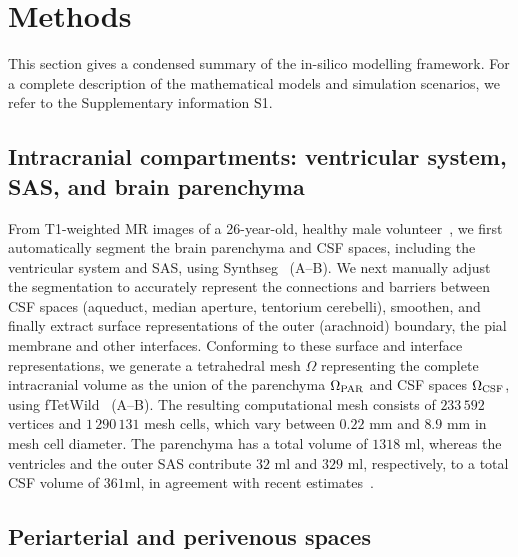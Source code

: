 \documentclass[fleqn,10pt]{wlscirep}
\begin{document}
\section*{Methods}

This section gives a condensed summary of the in-silico modelling
framework. For a complete description of the mathematical models and
simulation scenarios, we refer to the Supplementary information S1.

\subsection*{Intracranial compartments: ventricular system, SAS, and brain parenchyma}

From T1-weighted MR images of a 26-year-old, healthy male volunteer~\cite{hodneland2019new},
we first automatically segment the brain parenchyma and CSF spaces,
including the ventricular system and SAS, using
Synthseg~\cite{billot2023robust,billot2023synthseg}
(A--B). We next manually adjust the segmentation to
accurately represent the connections and barriers between CSF spaces (aqueduct,
median aperture, tentorium cerebelli), smoothen, and finally extract
surface representations of the outer (arachnoid) boundary, the pial
membrane and other interfaces. Conforming to these surface and
interface representations, we generate a tetrahedral mesh $\Omega$
representing the complete intracranial volume as the union of the
parenchyma $\Omega_{\rm PAR}$ and CSF spaces $\Omega_{\rm CSF}$, using
fTetWild~\cite{hu2020fast} (A--B). The resulting
computational mesh consists of $233\,592$ vertices and $1\,290\,131$
mesh cells, which vary between $0.22$ mm and $8.9$ mm in mesh cell
diameter. The parenchyma has a total volume of $1318$ ml, whereas the
ventricles and the outer SAS contribute $32$ ml and $329$ ml,
respectively, to a total CSF volume of $361$ml, in agreement with
recent estimates~\cite{hladky2024regulation}.

\subsection*{Periarterial and perivenous spaces}
\end{document}
